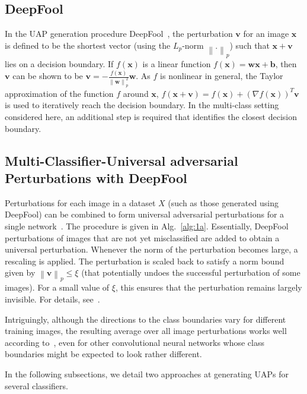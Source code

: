 \documentclass[runningheads]{llncs}
\newcommand{\xb}{\ensuremath{\mathbf{x}}}
\begin{document}
\subsection{DeepFool}\label{sec:DeepFool}

In the UAP generation procedure DeepFool~\cite{moosavi-dezfooli_deepfool_2016}, the perturbation \(\mathbf{v}\) for an image \(\xb\) is defined to be the shortest vector (using the \(L_p\)-norm \(\left\|.\right\|_p\)) such that \(\xb+\mathbf{v}\) lies on a decision boundary. 
If $f(\xb)$ is a linear function $f(\xb)=\mathbf{w} \xb+\mathbf{b}$, then \(\mathbf{v}\) can be shown to be \(\mathbf{v}=-\frac{f(\xb)}{\left\|\mathbf{w}\right\|_p^2}\mathbf{w}\). As \(f\) is nonlinear in general, the Taylor approximation of the function $f$ around \(\mathbf{x}\), \(f(\mathbf{x}+\mathbf{v})=f(\mathbf{x})+\left(\nabla f(\mathbf{x})\right)^T\mathbf{v}\) is used to iteratively reach the decision boundary. 
In the multi-class setting considered here, an additional step is required that identifies the closest decision boundary. 

\subsection{Multi-Classifier-Universal adversarial Perturbations with DeepFool}\label{sec:MultUAP}

Perturbations for each image in a dataset \(X\) (such as those generated using DeepFool) can be combined to form universal adversarial perturbations for a single network~\cite{moosavidezfooli_universal_2017}. The procedure is given in Alg.~\ref{alg:1a}. Essentially, DeepFool perturbations of images that are not yet misclassified are added to obtain a universal perturbation. 
Whenever the norm of the perturbation becomes large, a rescaling is applied. The perturbation is scaled back to satisfy a norm bound given by \(\left\|\mathbf{v}\right\|_p\leq\xi\) (that potentially undoes the successful perturbation of some images). For a small value of \(\xi\), this ensures that the perturbation remains largely invisible. For details, see~\cite{moosavidezfooli_universal_2017}. 

Intriguingly, although the directions to the class boundaries vary for different training images, the resulting average over all image perturbations works well according to~\cite{moosavidezfooli_universal_2017}, even for other convolutional neural networks whose class boundaries might be expected to look rather different. 

In the following subsections, we detail two approaches at generating UAPs for several classifiers.
\end{document}
